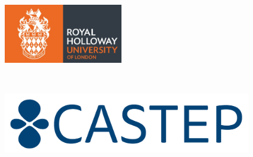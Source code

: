 \documentclass[article]{revtex4}
\begin{document}
\begin{titlepage}
\begin{center}
\begin{minipage}{0.35\textwidth}
\begin{flushleft}
\includegraphics[height=2.6cm]{rhul_logo.jpg}
\end{flushleft}
\end{minipage}
~
\begin{minipage}{0.63\textwidth}
\begin{flushright}
\includegraphics[height=2.6cm]{castep_logo.png}
\end{flushright}
\end{minipage}

\end{center}
\end{titlepage}


\tableofcontents

\newpage




\newpage



\end{document}

